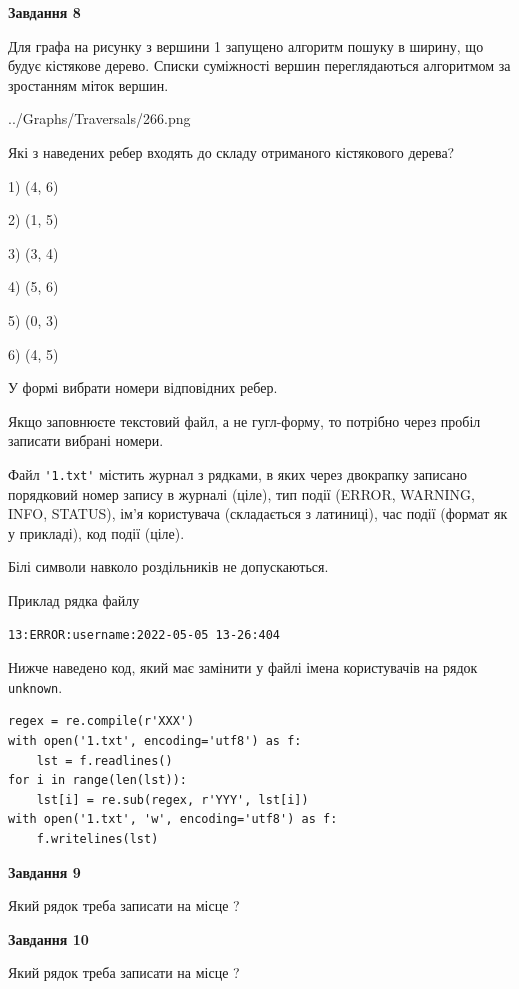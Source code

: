 \documentclass[12pt, ukrainian]{article}
\def\code#1{\Verb!#1!}
\begin{document}
{\begin {large}
{\begin {center}\textbf{Завдання 8}\end {center}}\par
Для графа на рисунку з вершини 1 запущено алгоритм пошуку в ширину, що будує кістякове дерево. Списки суміжності вершин переглядаються алгоритмом за зростанням міток вершин.\par
\begin{center}
	{../Graphs/Traversals/266.png}
\end{center}
\par Які з наведених ребер входять до складу отриманого кістякового дерева?\par
1) (4, 6)\par
2) (1, 5)\par
3) (3, 4)\par
4) (5, 6)\par
5) (0, 3)\par
6) (4, 5)\par
{\vskip 15pt} У формі вибрати номери відповідних ребер.


Якщо заповнюєте текстовий файл, а не гугл-форму, то потрібно через пробіл записа\-ти вибрані номери.\par
\newpage


Файл \code{'1.txt'} містить журнал з рядками, в яких через двокрапку записано поряд\-ко\-вий номер запису в журналі (ціле), тип події (ERROR, WARNING, INFO, STATUS), ім'я користувача (складається з латиниці), час події (фор\-мат як у прикладі), код події (ціле).

Білі символи навколо роздільників не допускаються.

Приклад рядка файлу



\begin{verbatim}
13:ERROR:username:2022-05-05 13-26:404
\end{verbatim}


Нижче наведено код, який має замінити у файлі імена користувачів на рядок \code{unknown}.



\begin{verbatim}
regex = re.compile(r'XXX')
with open('1.txt', encoding='utf8') as f:
    lst = f.readlines()
for i in range(len(lst)):
    lst[i] = re.sub(regex, r'YYY', lst[i])
with open('1.txt', 'w', encoding='utf8') as f:
    f.writelines(lst)
\end{verbatim}




{\begin {center}\textbf{Завдання 9}\end {center}}\par
Який рядок треба записати на місце  ?\par
\vspace{5mm}


{\begin {center}\textbf{Завдання 10}\end {center}}\par
Який рядок треба записати на місце  ?\par


\newpage


\end {large}}
\end{document}
